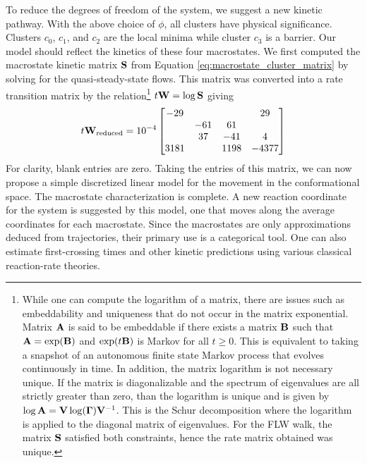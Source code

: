 To reduce the degrees of freedom of the system, we suggest a new kinetic pathway. With the above choice of $\phi$, all clusters have physical significance. Clusters $c_0$, $c_1$, and $c_2$ are the local minima while cluster $c_3$ is a barrier. Our model should reflect the kinetics of these four macrostates. We first computed the macrostate kinetic matrix ${\bf S}$ from Equation \ref{eq:macrostate_cluster_matrix} by solving for the quasi-steady-state flows. This matrix was converted into  a rate transition matrix by the relation\footnote{
While one can compute the logarithm of a matrix, there are issues such as  embeddability and uniqueness that do not occur in the matrix exponential. Matrix ${\bf A}$ is said to be embeddable if there exists a matrix ${\bf B}$ such that ${\bf A} = \exp({\bf B})$ and $\exp(t {\bf B})$ is Markov for all $t \ge 0$. This is equivalent to taking a snapshot of an autonomous finite state Markov process that evolves continuously in time.\cite{davies_embeddable_2010} In addition, the matrix logarithm is not necessary unique. If the matrix is diagonalizable and the spectrum of eigenvalues are all strictly greater than zero, than the logarithm is unique and is given by $\log {\bf A} = {\bf V} \log ({\bf \Gamma}) {\bf V}^{-1}$. This is the Schur decomposition where the logarithm is applied to the diagonal matrix of eigenvalues. For the FLW walk, the matrix ${\bf S}$ satisfied both constraints, hence the rate matrix obtained was unique.
} $t {\bf W} = \log {\bf S}$ giving
%
\begin{equation}
  t {\bf W}_\text{reduced} = 10^{-4}
  \begin{bmatrix}
    -29  &  &  & 29 \\
    & -61 & 61 &  \\
    & 37 & -41 & 4 \\
    3181 &         & 1198 & -4377 \\
  \end{bmatrix}
\end{equation}
%
For clarity, blank entries are zero. Taking the entries of this matrix, we can now propose a simple discretized linear model for the movement in the conformational space.
%
%
The macrostate characterization is complete. A new reaction coordinate for the system is suggested by this model, one that moves along the average coordinates for each macrostate. Since the macrostates are only approximations deduced from trajectories, their primary use is a categorical tool. One can also estimate first-crossing times and other kinetic predictions using various classical reaction-rate theories.\cite{haenggi_reaction-rate_1990} 

